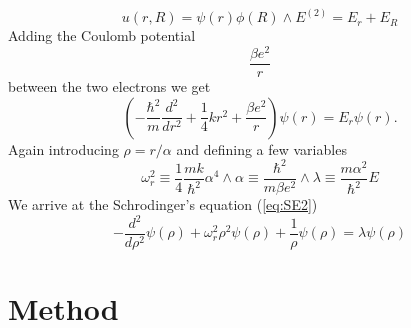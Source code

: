 \documentclass[reprint,english,notitlepage,nofootinbib]{revtex4-1}  %
\begin{document}
\begin{equation*}
	u(r, R) = \psi(r)\phi(R) \wedge E^{(2)} = E_r + E_R
\end{equation*}
Adding the Coulomb potential
\begin{equation*}
	\frac{\beta e^2}{r}
\end{equation*}
between the two electrons we get
\begin{equation*}
	\left(  -\frac{\hbar^2}{m} \frac{d^2}{dr^2}+ \frac{1}{4}k r^2+\frac{\beta e^2}{r}\right)\psi(r)  = E_r \psi(r).
\end{equation*}
Again introducing $\rho = r/\alpha$ and defining a few variables
\begin{equation*}
	\omega_r^2\equiv \frac{1}{4}\frac{mk}{\hbar^2} \alpha^4 \wedge \alpha \equiv \frac{\hbar^2}{m\beta e^2} \wedge \lambda \equiv \frac{m\alpha^2}{\hbar^2}E
\end{equation*}
We arrive at the Schrodinger's equation (\ref{eq:SE2})
\begin{equation}
	-\frac{d^2}{d\rho^2}\psi(\rho) + \omega_r^2\rho^2\psi(\rho) + \frac{1}{\rho}\psi(\rho) = \lambda\psi(\rho)
	\label{eq:SE2}
\end{equation}

\section{Method}
\end{document}
